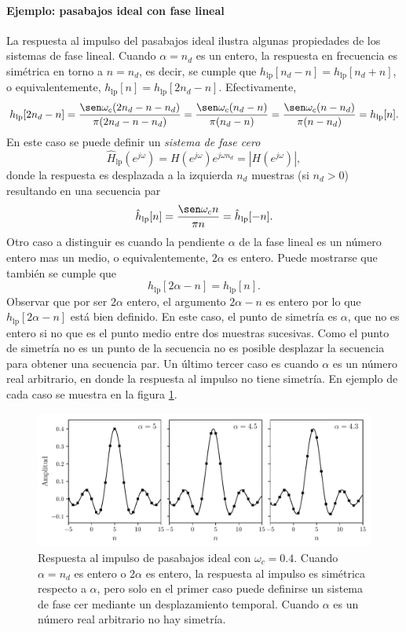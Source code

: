 \documentclass[a4paper]{report}
\begin{document}
\paragraph{Ejemplo: pasabajos ideal con fase lineal} La respuesta al impulso del pasabajos ideal ilustra algunas propiedades de los sistemas de fase lineal. Cuando \(\alpha=n_d\) es un entero, la respuesta en frecuencia es simétrica en torno a \(n=n_d\), es decir, se cumple que \(h_\textrm{lp}[n_d-n]=h_\textrm{lp}[n_d+n]\), o equivalentemente, \(h_\textrm{lp}[n]=h_\textrm{lp}[2n_d-n]\). Efectivamente,
\[
 h_\textrm{lp}[2n_d-n]=\frac{\sen\omega_c(2n_d-n-n_d)}{\pi(2n_d-n-n_d)}=\frac{\sen\omega_c(n_d-n)}{\pi(n_d-n)}
 =\frac{\sen\omega_c(n-n_d)}{\pi(n-n_d)}=h_\textrm{lp}[n].
\]
En este caso se puede definir un \emph{sistema de fase cero}
\[
 \hat{H}_\textrm{lp}(e^{j\omega})=H(e^{j\omega})e^{j\omega n_d}=|H(e^{j\omega})|,
\]
donde la respuesta es desplazada a la izquierda \(n_d\) muestras (si \(n_d>0\)) resultando en una secuencia par
\[
 \hat{h}_\textrm{lp}[n]=\frac{\sen\omega_c n}{\pi n}=\hat{h}_\textrm{lp}[-n].
\]
Otro caso a distinguir es cuando la pendiente \(\alpha\) de la fase lineal es un número entero mas un medio, o equivalentemente, \(2\alpha\) es entero. Puede mostrarse que también se cumple que 
\[
 h_\textrm{lp}[2\alpha-n]=h_\textrm{lp}[n].
\]
Observar que por ser \(2\alpha\) entero, el argumento \(2\alpha-n\) es entero por lo que \(h_\textrm{lp}[2\alpha-n]\) está bien definido. En este caso, el punto de simetría es \(\alpha\), que no es entero si no que es el punto medio entre dos muestras sucesivas. Como el punto de simetría no es un punto de la secuencia no es posible desplazar la secuencia para obtener una secuencia par. 
Un último tercer caso es cuando \(\alpha\) es un número real arbitrario, en donde la respuesta al impulso no tiene simetría. En ejemplo de cada caso se muestra en la figura \ref{fig:transform_analysis_example_05_14_linear_phase}.
\begin{figure}[!htb]
 \begin{center}
 \includegraphics[width=1\textwidth]{figuras/transform_analysis_example_05_14_linear_phase.pdf}
 \caption{\label{fig:transform_analysis_example_05_14_linear_phase} Respuesta al impulso de pasabajos ideal con \(\omega_c=0.4\). Cuando \(\alpha=n_d\) es entero o \(2\alpha\) es entero, la respuesta al impulso es simétrica respecto a \(\alpha\), pero solo en el primer caso puede definirse un sistema de fase cer mediante un desplazamiento temporal. Cuando \(\alpha\) es un número real arbitrario no hay simetría.}
 \end{center}
\end{figure}
\end{document}
